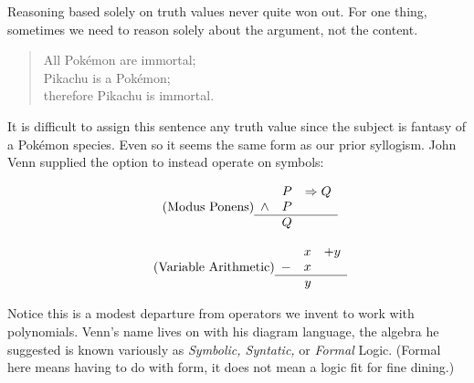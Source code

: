 Reasoning based solely on truth values never quite won out.
For one thing, sometimes we need to reason solely about the argument, not the content.
\begin{quote}
    All Pok\'emon are immortal; \\
    Pikachu is a Pok\'emon;\\
    therefore Pikachu is immortal.
\end{quote}
It is difficult to assign this sentence any truth value since 
the subject is fantasy of a Pok\'emon species.  
Even so it seems the same form as our prior syllogism.
John Venn supplied the option to instead operate on symbols:
\begin{center}
\begin{minipage}{0.45\textwidth}
\begin{gather}
    \tag{Modus Ponens}
    \begin{array}{crl}
       &  P &\Rightarrow Q\\
     \wedge  &  P\\
    \hline 
       &  Q
    \end{array}
\end{gather}
\end{minipage}
\hfill
\begin{minipage}{0.45\textwidth}
    \begin{gather}
        \tag{Variable Arithmetic}
        \begin{array}{crl}
           &  x & + y\\
         -  &  x\\
        \hline 
            &  y
        \end{array}
    \end{gather}
\end{minipage}        
\end{center}
Notice this is a modest departure from operators we invent to 
work with polynomials.  Venn's name lives on with his 
diagram language, the algebra he suggested is known variously 
as \emph{Symbolic, Syntatic,} or \emph{Formal} Logic.  (Formal here means 
having to do with form, it does not mean a logic fit for fine dining.)

